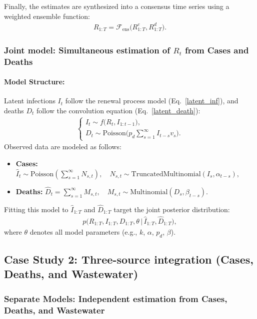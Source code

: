 \documentclass{article}
\begin{document}
Finally, the estimates are synthesized into a consensus time series using a weighted ensemble function:
\begin{align}
R_{1:T} = \mathcal{F}_{\mathrm{ens}}\big(R_{1:T}^c, R_{1:T}^d\big).
\end{align}

\subsubsection{Joint model: Simultaneous estimation of $R_{t}$ from Cases and Deaths}

\paragraph{Model Structure:}
Latent infections $I_{t}$ follow the renewal process model (Eq.~\eqref{latent_inf}), and deaths $D_t$ follow the convolution equation (Eq.~\eqref{latent_death}):
\begin{align}
\begin{cases}
I_t \sim f\big(R_t, I_{1:t-1}\big),\\[4pt]
D_t \sim \mathrm{Poisson}\!\Big( p_d \sum_{s=1}^\infty I_{t-s} v_s \Big).
\end{cases}
\end{align}
Observed data are modeled as follows:
\begin{itemize}
    \item \textbf{Cases:} $\widehat{I}_t \sim \mathrm{Poisson}\left( \sum_{s=1}^\infty N_{s,t} \right), \quad N_{s,t} \sim \mathrm{TruncatedMultinomial}(I_s, \alpha_{t-s}),$
    \item \textbf{Deaths:} $\widehat{D}_t = \sum_{s=1}^\infty M_{s,t}, \quad M_{s,t} \sim \mathrm{Multinomial}(D_s, \beta_{t-s}).$
\end{itemize}
Fitting this model to $\widehat{I}_{1:T}$ and $\widehat{D}_{1:T}$ target the joint posterior distribution:
\begin{align}
p\big(R_{1:T}, I_{1:T}, D_{1:T}, \theta \,\big|\, \widehat{I}_{1:T}, \widehat{D}_{1:T}\big),
\end{align}
where $\theta$ denotes all model parameters (e.g., $k$, $\alpha$, $p_d$, $\beta$).


\subsection{Case Study 2: Three-source integration (Cases, Deaths, and Wastewater)}

\subsubsection{Separate Models: Independent estimation from Cases, Deaths, and Wastewater}
\end{document}
